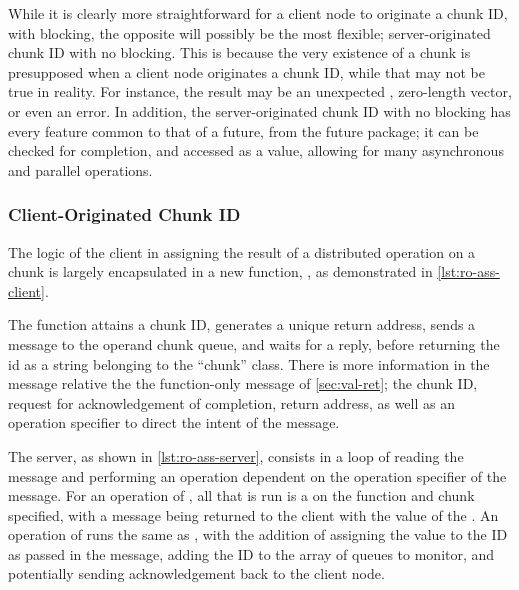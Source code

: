 
While it is clearly more straightforward for a client node to originate a chunk
ID, with blocking, the opposite will possibly be the most flexible;
server-originated chunk ID with no blocking.
This is because the very existence of a chunk is presupposed when a client
node originates a chunk ID, while that may not be true in reality.
For instance, the result may be an unexpected , zero-length
vector, or even an error.
In addition, the server-originated chunk ID with no blocking has every feature
common to that of a future, from the future package; it can be checked for
completion, and accessed as a value, allowing for many asynchronous and
parallel operations.

\subsubsection{Client-Originated Chunk ID}

The logic of the client in assigning the result of a distributed operation on a
chunk is largely encapsulated in a new function, , as
demonstrated in \cref{lst:ro-ass-client}.


The function attains a chunk ID, generates a unique return address, sends a
message to the operand chunk queue, and waits for a reply, before returning the
id as a string belonging to the ``chunk'' class.
There is more information in the message relative the the function-only
message of \cref{sec:val-ret}; the chunk ID, request for acknowledgement
of completion, return address, as well as an operation specifier to direct the
intent of the message.

The server, as shown in \cref{lst:ro-ass-server}, consists in a loop of
reading the message and performing an operation dependent on the operation
specifier of the message.
For an operation of , all that is run is a  on
the function and chunk specified, with a message being returned to the
client with the value of the .
An operation of  runs the same as , with the
addition of assigning the value to the ID as passed in the message, adding
the ID to the array of queues to monitor, and potentially sending
acknowledgement back to the client node.

